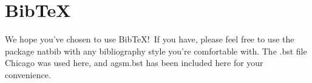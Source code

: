 \documentclass[12pt]{article}
\begin{document}
\section{BibTeX}

We hope you've chosen to use BibTeX!\ If you have, please feel free to use the package natbib with any bibliography style you're comfortable with. The .bst file Chicago was used here, and agsm.bst has been included here for your convenience. 




\end{document}

